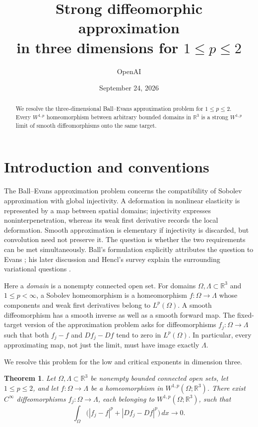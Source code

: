 \documentclass[11pt]{article}
\title{Strong diffeomorphic approximation\\in three dimensions for $1\le p\le2$}
\author{OpenAI}
\date{September 24, 2026}
\numberwithin{equation}{section}
\newtheorem{theorem}{Theorem}[section]
\theoremstyle{definition}
\theoremstyle{remark}
\begin{document}
\begin{abstract}
We resolve the three-dimensional Ball--Evans approximation problem for
$1\le p\le2$. Every $W^{1,p}$ homeomorphism between arbitrary bounded domains
in $\mathbb R^3$ is a strong $W^{1,p}$ limit of smooth diffeomorphisms onto the same
target.
\end{abstract}
\section{Introduction and conventions}\label{sec:introduction}

The Ball--Evans approximation problem concerns the compatibility of
Sobolev approximation with global injectivity. A deformation in nonlinear
elasticity is represented by a map between spatial domains; injectivity
expresses noninterpenetration, whereas its weak first derivative records
the local deformation. Smooth approximation is elementary if injectivity
is discarded, but convolution need not preserve it. The question is
whether the two requirements can be met simultaneously. Ball's
formulation explicitly attributes the question to Evans
\cite[Section~3, p.~8]{Ball2001}; his later discussion and Hencl's survey
explain the surrounding variational questions
\cite{Ball2010,Hencl2025}.

Here a \emph{domain} is a nonempty connected open set. For domains
$\Omega,\Lambda\subset\mathbb R^3$ and $1\le p<\infty$, a Sobolev
homeomorphism is a homeomorphism $f:\Omega\to\Lambda$ whose components
and weak first derivatives belong to $L^p(\Omega)$. A smooth
diffeomorphism has a smooth inverse as well as a smooth forward map.
The fixed-target version of the approximation problem asks for
diffeomorphisms $f_j:\Omega\to\Lambda$ such that both $f_j-f$ and
$Df_j-Df$ tend to zero in $L^p(\Omega)$. In particular, every
approximating map, not just the limit, must have image exactly
$\Lambda$.

We resolve this problem for the low and critical exponents in dimension
three.

\begin{theorem}\label{main:theorem}
Let $\Omega,\Lambda\subset\mathbb R^3$ be nonempty bounded connected open sets, let $1\le p\le2$, and let $f:\Omega\to\Lambda$ be a homeomorphism in $W^{1,p}(\Omega;\mathbb R^3)$. There exist $C^\infty$ diffeomorphisms $f_j:\Omega\to\Lambda$, each belonging to $W^{1,p}(\Omega;\mathbb R^3)$, such that
\begin{equation}\label{main:convergence}
\int_\Omega\bigl( |f_j-f|^p+|Df_j-Df|^p\bigr)\,dx\longrightarrow0.
\end{equation}
\end{theorem}
\end{document}
